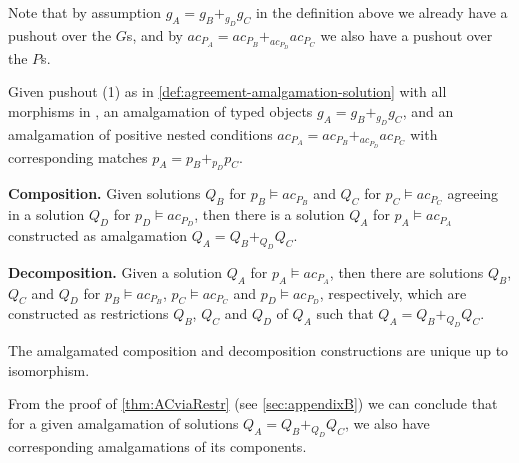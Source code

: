 \begin{remark}\label{rem:agreement-amalgamation-solution}
	Note that by assumption $g_A = g_B +_{g_D} g_C$ in the definition above we already have a pushout over the $G$s, and by 
	$ac_{P_A} = ac_{P_B} +_{ac_{P_D}} ac_{P_C}$ we also have a pushout over the $P$s. 
\end{remark}

\begin{theorem}\label{thm:ACviaRestr}
Given pushout (1) as in \autoref{def:agreement-amalgamation-solution} with all morphisms in \M, 
an amalgamation of typed objects $g_A = g_B +_{g_D} g_C$,
and an amalgamation of positive nested conditions $ac_{P_A} = ac_{P_B} +_{ac_{P_D}} ac_{P_C}$ 
with corresponding matches $p_A = p_B +_{p_D} p_C$.
\begin{description}
	\item \textbf{Composition.}
		Given solutions $Q_B$ for $p_B \vDash ac_{P_B}$ and $Q_C$ for $p_C \vDash ac_{P_C}$ agreeing in a solution $Q_D$ for $p_D \vDash ac_{P_D}$,
		then there is a solution $Q_A$ for $p_A \vDash ac_{P_A}$ constructed as 
		amalgamation $Q_A = Q_B +_{Q_D} Q_C$.
	\item \textbf{Decomposition.}
		Given a solution $Q_A$ for $p_A \vDash ac_{P_A}$, then there are 
		solutions $Q_B$, $Q_C$ and $Q_D$ for \linebreak
		$p_B \vDash ac_{P_B}$, $p_C \vDash ac_{P_C}$ 
		and $p_D \vDash ac_{P_D}$, respectively, which are constructed as
		restrictions $Q_B$, $Q_C$ and $Q_D$ of $Q_A$ such that
		$Q_A = Q_B +_{Q_D} Q_C$.
\end{description}
The amalgamated composition and decomposition constructions are unique up to isomorphism.
\end{theorem}








\begin{remark}\label{rem:amalgamation-solutions}
	From the proof of \autoref{thm:ACviaRestr} (see \autoref{sec:appendixB}) we can conclude that for a given amalgamation of solutions $Q_A = Q_B +_{Q_D} Q_C$, we also
	have corresponding amalgamations of its components.
\end{remark}